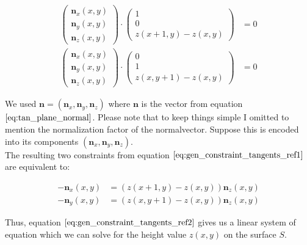 \documentclass{paper}
\begin{document}
\begin{align}
    \left(
        \begin{array}{c}
            \textbf{n}_x(x,y) \\
            \textbf{n}_y(x,y) \\
            \textbf{n}_z(x,y)
        \end{array}
    \right) 
    \cdot 
    \left(
        \begin{array}{c}
            1 \\
            0 \\
            z(x+1,y)-z(x,y)
        \end{array}
    \right) &= 0 \nonumber \\
        \left(
        \begin{array}{c}
            \textbf{n}_x(x,y) \\
            \textbf{n}_y(x,y) \\
            \textbf{n}_z(x,y)
        \end{array}
    \right) 
    \cdot 
    \left(
        \begin{array}{c}
            0 \\
            1 \\
            z(x,y+1)-z(x,y)
        \end{array}
    \right) &= 0 
\label{eq:gen_constraint_tangents_ref1}
\end{align}

We used $\textbf{n} = ( \textbf{n}_x,  \textbf{n}_y,  \textbf{n}_z)$ where $\textbf{n}$ is the vector from equation $\ref{eq:tan_plane_normal}$. Please note that to keep things simple I omitted to mention the normalization factor of the normalvector. Suppose this is encoded into its components $( \textbf{n}_x,  \textbf{n}_y,  \textbf{n}_z)$. \\

The resulting two constraints from equation $\ref{eq:gen_constraint_tangents_ref1}$ are equivalent to:

\begin{align}
    -\textbf{n}_x(x,y) &= \left(z(x+1,y)-z(x,y)\right)\textbf{n}_z(x,y) \nonumber \\
    -\textbf{n}_y(x,y) &= \left(z(x,y+1)-z(x,y)\right)\textbf{n}_z(x,y)
\label{eq:gen_constraint_tangents_ref2}
\end{align}

Thus, equation $\ref{eq:gen_constraint_tangents_ref2}$ gives us a linear system of equation which we can solve for the height value $z(x,y)$ on the surface $S$. \\
\end{document}
